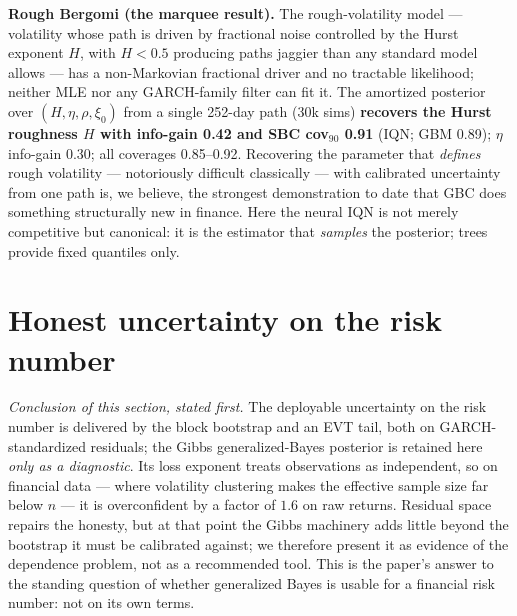 \documentclass[11pt]{article}
\theoremstyle{remark}
\begin{document}
\textbf{Rough Bergomi (the marquee result).} The rough-volatility model
\citep{bayer2016rbergomi, gatheral2018roughvol} --- volatility whose path
is driven by fractional noise controlled by the Hurst exponent $H$, with
$H<0.5$ producing paths jaggier than any standard model allows ---
has a non-Markovian fractional driver and no tractable likelihood;
neither MLE nor any GARCH-family filter can fit it. The amortized
posterior over $(H, \eta, \rho, \xi_0)$ from a single 252-day path (30k
sims) \textbf{recovers the Hurst roughness $H$ with info-gain 0.42 and
SBC cov$_{90}$ 0.91} (IQN; GBM 0.89); $\eta$ info-gain 0.30; all
coverages 0.85--0.92. Recovering the parameter that \emph{defines} rough
volatility --- notoriously difficult classically --- with calibrated
uncertainty from one path is, we believe, the strongest demonstration to
date that GBC does something structurally new in finance. Here the
neural IQN is not merely competitive but canonical: it is the estimator
that \emph{samples} the posterior; trees provide fixed quantiles only.


\section{Honest uncertainty on the risk number}\label{sec:uncertainty}

\noindent\emph{Conclusion of this section, stated first.} The deployable
uncertainty on the risk number is delivered by the block bootstrap and an
EVT tail, both on GARCH-standardized residuals; the Gibbs
generalized-Bayes posterior is retained here \emph{only as a diagnostic}.
Its loss exponent treats observations as independent, so on financial
data --- where volatility clustering makes the effective sample size far
below $n$ --- it is overconfident by a factor of $1.6$ on raw returns.
Residual space repairs the honesty, but at that point the Gibbs machinery
adds little beyond the bootstrap it must be calibrated against; we
therefore present it as evidence of the dependence problem, not as a
recommended tool. This is the paper's answer to the standing question of
whether generalized Bayes is usable for a financial risk number: not on
its own terms.
\end{document}
